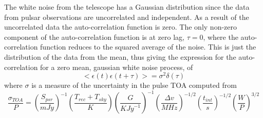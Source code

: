 \documentclass[12pt]{article}
\begin{document}
	The white noise from the telescope has a Gaussian distribution since the data from pulsar observations are uncorrelated and independent. As a result of the uncorrelated data the auto-correlation function is zero. The only non-zero component of the auto-correlation function is at zero lag, $\tau=0$, where the auto-correlation function reduces to the squared average of the noise. This is just the distribution of the data from the mean, thus giving the expression for the auto-correlation for a zero mean, gaussian white noise process, of 
	\begin{equation}\label{auto-correlation of white noise}
	<\epsilon(t)\epsilon(t+\tau)>=\sigma^2 \delta(\tau)
	\end{equation}
	where $\sigma$ is a measure of the uncertainty in the pulse TOA computed from \cite{lorimer2008binary} \\ %
	\begin{equation} \label{uncertainty in toa}
	\frac{\sigma_{TOA}}{P}=(\frac{S_{psr}}{mJy})^{-1}(\frac{T_{rec}+T_{sky}}{K})(\frac{G}{K{Jy}^{-1}})^{-1}(\frac{\Delta{v}}{MHz})^{-1/2}(\frac{t_{int}}{s})^{-1/2}(\frac{W}{P})^{3/2}
	\end{equation}
	
\end{document}
